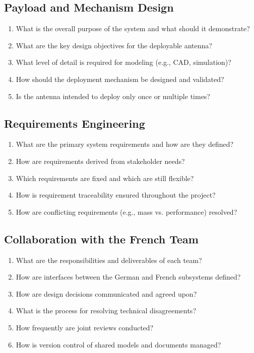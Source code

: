 	\subsection{Payload and Mechanism Design}
	
	\begin{enumerate}
		\item What is the overall purpose of the system and what should it demonstrate?
		\item What are the key design objectives for the deployable antenna?
		\item What level of detail is required for modeling (e.g., CAD, simulation)?
		\item How should the deployment mechanism be designed and validated?
		\item Is the antenna intended to deploy only once or multiple times?
	\end{enumerate}
	
	\subsection{Requirements Engineering}
	
	\begin{enumerate}
		\item What are the primary system requirements and how are they defined?
		\item How are requirements derived from stakeholder needs?
		\item Which requirements are fixed and which are still flexible?
		\item How is requirement traceability ensured throughout the project?
		\item How are conflicting requirements (e.g., mass vs. performance) resolved?
	\end{enumerate}
	
	\subsection{Collaboration with the French Team}
	
	\begin{enumerate}
		\item What are the responsibilities and deliverables of each team?
		\item How are interfaces between the German and French subsystems defined?
		\item How are design decisions communicated and agreed upon?
		\item What is the process for resolving technical disagreements?
		\item How frequently are joint reviews conducted?
		\item How is version control of shared models and documents managed?
	\end{enumerate}
	
